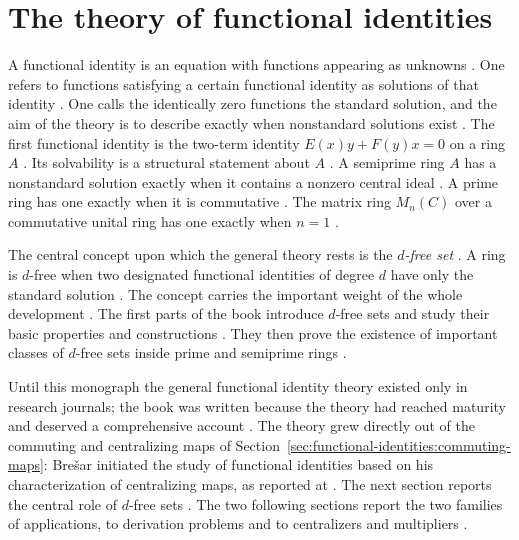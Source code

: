 \section{The theory of functional identities}\label{sec:functional-identities:fi-theory}

A functional identity is an equation with functions appearing as unknowns
\cite[p.~9]{BresarMartindaleChebotar2007FI}. One refers to functions
satisfying a certain functional identity as solutions of that identity
\cite[p.~9]{BresarMartindaleChebotar2007FI}. One calls the identically
zero functions the standard solution, and the aim of the theory is to
describe exactly when nonstandard solutions exist
\cite[p.~9]{BresarMartindaleChebotar2007FI}. The first functional identity
is the two-term identity $E(x)y+F(y)x=0$ on a ring $A$
\cite[Example~1.1, p.~10]{BresarMartindaleChebotar2007FI}. Its solvability
is a structural statement about $A$
\cite[Example~1.1, p.~10]{BresarMartindaleChebotar2007FI}. A semiprime
ring $A$ has a nonstandard solution exactly when it contains a nonzero
central ideal \cite[Example~1.1, p.~10]{BresarMartindaleChebotar2007FI}.
A prime ring has one exactly when it is commutative
\cite[Example~1.1, p.~10]{BresarMartindaleChebotar2007FI}. The matrix
ring $M_n(C)$ over a commutative unital ring has one exactly when $n=1$
\cite[Example~1.1, p.~10]{BresarMartindaleChebotar2007FI}.

The central concept upon which the general theory rests is the
\emph{$d$-free set} \cite[p.~x]{BresarMartindaleChebotar2007FI}. A ring is
$d$-free when two designated functional identities of degree $d$ have only
the standard solution \cite[p.~21]{BresarMartindaleChebotar2007FI}. The
concept carries the important weight of the whole development
\cite[p.~21]{BresarMartindaleChebotar2007FI}. The first
parts of the book introduce $d$-free sets and study their basic properties
and constructions \cite[p.~x]{BresarMartindaleChebotar2007FI}. They then
prove the existence of important classes of $d$-free sets inside prime and
semiprime rings \cite[p.~x]{BresarMartindaleChebotar2007FI}.

Until this monograph the general functional identity theory existed only
in research journals; the book was written because the theory had reached
maturity and deserved a comprehensive account
\cite[p.~ix]{BresarMartindaleChebotar2007FI}. The theory grew directly
out of the commuting and centralizing maps of
Section~\ref{sec:functional-identities:commuting-maps}: Bre\v{s}ar initiated
the study of functional identities based on his characterization of
centralizing maps, as reported at \cite[p.~333]{LeeTK1997Centralizing}.
The next section reports the central role of $d$-free sets
\cite[p.~x]{BresarMartindaleChebotar2007FI}. The two following sections
report the two families of applications, to derivation problems and to
centralizers and multipliers
\cite[p.~x]{BresarMartindaleChebotar2007FI}.
